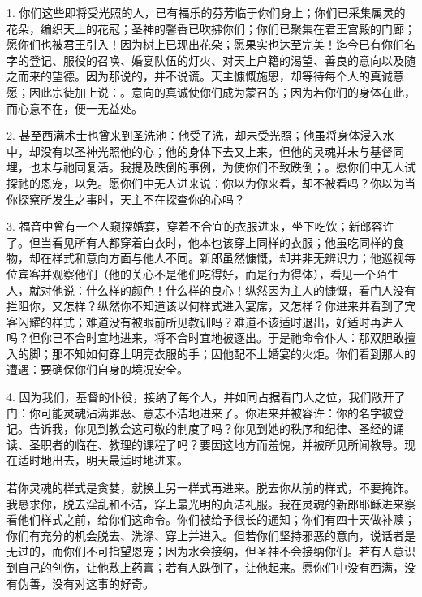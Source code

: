1. 你们这些即将受光照的人，已有福乐的芬芳临于你们身上；你们已采集属灵的花朵，编织天上的花冠；圣神的馨香已吹拂你们；你们已聚集在君王宫殿的门廊；愿你们也被君王引入！因为树上已现出花朵；愿果实也达至完美！迄今已有你们名字的登记、服役的召唤、婚宴队伍的灯火、对天上户籍的渴望、善良的意向以及随之而来的望德。因为那说的，并不说谎。天主慷慨施恩，却等待每个人的真诚意愿；因此宗徒加上说：。意向的真诚使你们成为蒙召的；因为若你们的身体在此，而心意不在，便一无益处。\par

2. 甚至西满术士也曾来到圣洗池：他受了洗，却未受光照；他虽将身体浸入水中，却没有以圣神光照他的心；他的身体下去又上来，但他的灵魂并未与基督同埋，也未与祂同复活。我提及跌倒的事例，为使你们不致跌倒；。愿你们中无人试探祂的恩宠，以免。愿你们中无人进来说：你以为你来看，却不被看吗？你以为当你探察所发生之事时，天主不在探查你的心吗？\par

3. 福音中曾有一个人窥探婚宴，穿着不合宜的衣服进来，坐下吃饮；新郎容许了。但当看见所有人都穿着白衣时，他本也该穿上同样的衣服；他虽吃同样的食物，却在样式和意向方面与他人不同。新郎虽然慷慨，却并非无辨识力；他巡视每位宾客并观察他们（他的关心不是他们吃得好，而是行为得体），看见一个陌生人，就对他说：什么样的颜色！什么样的良心！纵然因为主人的慷慨，看门人没有拦阻你，又怎样？纵然你不知道该以何样式进入宴席，又怎样？你进来并看到了宾客闪耀的样式；难道没有被眼前所见教训吗？难道不该适时退出，好适时再进入吗？但你已不合时宜地进来，将不合时宜地被逐出。于是祂命令仆人：那双胆敢擅入的脚；那不知如何穿上明亮衣服的手；因他配不上婚宴的火炬。你们看到那人的遭遇：要确保你们自身的境况安全。\par

4. 因为我们，基督的仆役，接纳了每个人，并如同占据看门人之位，我们敞开了门：你可能灵魂沾满罪恶、意志不洁地进来了。你进来并被容许：你的名字被登记。告诉我，你见到教会这可敬的制度了吗？你见到她的秩序和纪律、圣经的诵读、圣职者的临在、教理的课程了吗？要因这地方而羞愧，并被所见所闻教导。现在适时地出去，明天最适时地进来。\par

若你灵魂的样式是贪婪，就换上另一样式再进来。脱去你从前的样式，不要掩饰。我恳求你，脱去淫乱和不洁，穿上最光明的贞洁礼服。我在灵魂的新郎耶稣进来察看他们样式之前，给你们这命令。你们被给予很长的通知；你们有四十天做补赎；你们有充分的机会脱去、洗涤、穿上并进入。但若你们坚持邪恶的意向，说话者是无过的，而你们不可指望恩宠；因为水会接纳，但圣神不会接纳你们。若有人意识到自己的创伤，让他敷上药膏；若有人跌倒了，让他起来。愿你们中没有西满，没有伪善，没有对这事的好奇。\par

